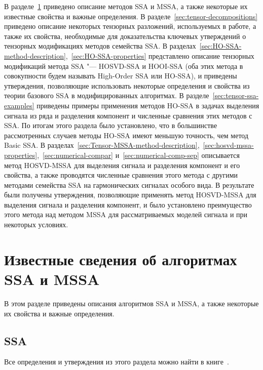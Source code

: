 \documentclass[specialist,
    substylefile=spbu.rtx,
    subf,href,colorlinks=true, 12pt]{disser}
\theoremstyle{plain}
\theoremstyle{definition}
\theoremstyle{remark}
\begin{document}
    В разделе~\ref{sec:known-results-ssa} приведено описание методов SSA и MSSA, а также некоторые их
    известные свойства и важные определения.
    В разделе~\ref{sec:tensor-decompositions} приведено описание некоторых тензорных разложений, используемых в работе,
    а также их свойства, необходимые для доказательства ключевых утверждений о
    тензорных модификациях методов семейства SSA.
    В разделах~\ref{sec:HO-SSA-method-description},~\ref{sec:HO-SSA-properties} представлено описание
    тензорных модификаций метода SSA "--- HOSVD-SSA и HOOI-SSA (оба этих метода в совокупности будем называть
    High-Order SSA или HO-SSA), и приведены утверждения, позволяющие использовать некоторые определения и
    свойства из теории базового SSA в модифицированных алгоритмах.
    В разделе~\ref{sec:tensor-ssa-examples} приведены примеры применения методов HO-SSA в задачах выделения сигнала
    из ряда и разделения компонент и численные сравнения этих методов с SSA.
    По итогам этого раздела
    было установлено,
    что в большинстве рассмотренных случаев методы HO-SSA имеют меньшую точность, чем метод Basic SSA.
    В разделах~\ref{sec:Tensor-MSSA-method-description},~\ref{sec:hosvd-mssa-properties},~\ref{sec:numerical-compar}
    и~\ref{sec:numerical-comp-sep}
    описывается метод HOSVD-MSSA для выделения сигнала и разделения компонент и его свойства, а также
    проводятся численные сравнения этого метода с другими методами семейства SSA на гармонических сигналах особого вида.
    В результате были получены утверждения, позволяющие применять метод HOSVD-MSSA для выделения сигнала и разделения компонент, и было установлено преимущество этого метода над методом MSSA для рассматриваемых моделей сигнала
    и при некоторых условиях.
    \newpage


    \section{Известные сведения об алгоритмах SSA и MSSA}\label{sec:known-results-ssa}
    В этом разделе приведены описания алгоритмов SSA и MSSA, а также некоторые их свойства и важные определения.


    \subsection{SSA}\label{subsec:ssa}
    Все определения и утверждения из этого раздела можно найти в книге~\cite{ssa}.
\end{document}
